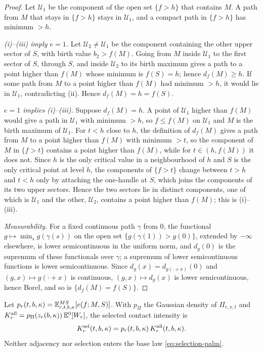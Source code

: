 \begin{proof}
Let $\mathcal U_1$ be the component of the open set $\{f>h\}$ that contains $M$. A path from $M$ that stays in $\{f>h\}$ stays in $\mathcal U_1$, and a compact path in $\{f>h\}$ has minimum $>h$.

\emph{(i)--(iii) imply $e=1$.} Let $\mathcal U_2\ne\mathcal U_1$ be the component containing the other upper sector of $S$, with birth value $b_2>f(M)$. Going from $M$ inside $\mathcal U_1$ to the first sector of $S$, through $S$, and inside $\mathcal U_2$ to its birth maximum gives a path to a point higher than $f(M)$ whose minimum is $f(S)=h$; hence $d_f(M)\ge h$. If some path from $M$ to a point higher than $f(M)$ had minimum $>h$, it would lie in $\mathcal U_1$, contradicting (ii). Hence $d_f(M)=h=f(S)$.

\emph{$e=1$ implies (i)--(iii).} Suppose $d_f(M)=h$. A point of $\mathcal U_1$ higher than $f(M)$ would give a path in $\mathcal U_1$ with minimum $>h$, so $f\le f(M)$ on $\mathcal U_1$ and $M$ is the birth maximum of $\mathcal U_1$. For $t<h$ close to $h$, the definition of $d_f(M)$ gives a path from $M$ to a point higher than $f(M)$ with minimum $>t$, so the component of $M$ in $\{f>t\}$ contains a point higher than $f(M)$, while for $t\in(h,f(M))$ it does not. Since $h$ is the only critical value in a neighbourhood of $h$ and $S$ is the only critical point at level $h$, the components of $\{f>t\}$ change between $t>h$ and $t<h$ only by attaching the one-handle at $S$, which joins the components of its two upper sectors. Hence the two sectors lie in distinct components, one of which is $\mathcal U_1$ and the other, $\mathcal U_2$, contains a point higher than $f(M)$; this is (i)--(iii).

\emph{Measurability.} For a fixed continuous path $\gamma$ from $0$, the functional $g\mapsto\min_s g(\gamma(s))$ on the open set $\{g(\gamma(1))>g(0)\}$, extended by $-\infty$ elsewhere, is lower semicontinuous in the uniform norm, and $d_g(0)$ is the supremum of these functionals over $\gamma$; a supremum of lower semicontinuous functions is lower semicontinuous. Since $d_g(x)=d_{g(\cdot+x)}(0)$ and $(g,x)\mapsto g(\cdot+x)$ is continuous, $(g,x)\mapsto d_g(x)$ is lower semicontinuous, hence Borel, and so is $\{d_f(M)=f(S)\}$.
\end{proof}

\begin{definition}\label{def:selection-prob}
Let $p_r(t,b,\kappa)=\mathbb E^{MS}_{r,t,b,\kappa}[e(f;M,S)]$. With $p_\Pi$ the Gaussian density of $\Pi_{r,x,t}$ and $K^{\rm all}_r=p_\Pi(z_r(b,\kappa))\,\mathbb E^0[W_r]$, the selected contact intensity is
\begin{equation}\label{eq:selection-Ksel}
K^{\rm sel}_r(t,b,\kappa)=p_r(t,b,\kappa)\,K^{\rm all}_r(t,b,\kappa).
\end{equation}
Neither adjacency nor selection enters the base law \eqref{eq:selection-palm}.
\end{definition}


